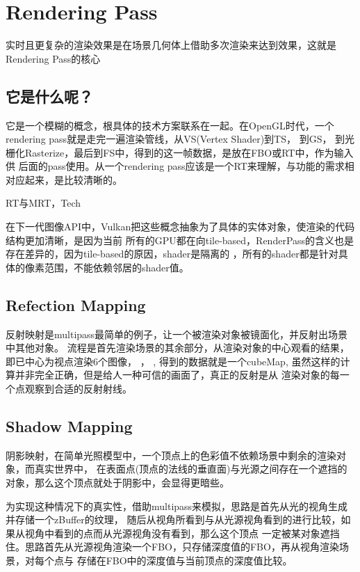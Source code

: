 \section{Rendering Pass}

实时且更复杂的渲染效果是在场景几何体上借助多次渲染来达到效果，这就是Rendering Pass的核心

\subsection{它是什么呢？}

它是一个模糊的概念，根具体的技术方案联系在一起。在OpenGL时代，一个rendering pass就是走完一遍渲染管线，从VS(Vertex Shader)到TS，
到GS， 到光栅化Rasterize，最后到FS中，得到的这一帧数据，是放在FBO或RT中，作为输入供
后面的pass使用。从一个rendering pass应该是一个RT来理解，与功能的需求相对应起来，是比较清晰的。

\par
RT与MRT，Tech

\par
在下一代图像API中，Vulkan把这些概念抽象为了具体的实体对象，使渲染的代码结构更加清晰，是因为当前
所有的GPU都在向tile-based，RenderPass的含义也是存在差异的，因为tile-based的原因，shader是隔离的
，所有的shader都是针对具体的像素范围，不能依赖邻居的shader值。\cite{gdc2020Arm}

\subsection{Refection Mapping}
反射映射是multipass最简单的例子，让一个被渲染对象被镜面化，并反射出场景中其他对象。
流程是首先渲染场景的其余部分，从渲染对象的中心观看的结果，即已中心为视点渲染6个图像，
，
,
得到的数据就是一个cubeMap, 虽然这样的计算并非完全正确，但是给人一种可信的画面了，真正的反射是从
渲染对象的每一个点观察到合适的反射射线。

\subsection{Shadow Mapping}
阴影映射，在简单光照模型中，一个顶点上的色彩值不依赖场景中剩余的渲染对象，而真实世界中，
在表面点(顶点的法线的垂直面)与光源之间存在一个遮挡的对象，那么这个顶点就处于阴影中，会显得更暗些。

为实现这种情况下的真实性，借助multipass来模拟，思路是首先从光的视角生成并存储一个zBuffer的纹理，
随后从视角所看到与从光源视角看到的进行比较，如果从视角中看到的点而从光源视角没有看到，那么这个顶点
一定被某对象遮挡住。思路首先从光源视角渲染一个FBO，只存储深度值的FBO，再从视角渲染场景，对每个点与
存储在FBO中的深度值与当前顶点的深度值比较。


